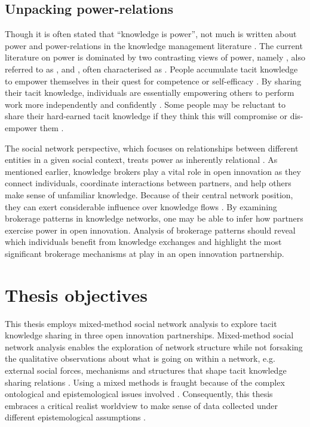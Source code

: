 \subsection{Unpacking power-relations} 

Though it is often stated that \enquote{knowledge is power}, not much is written about power and power-relations in the knowledge management literature \citep{haugaard2012rethinking}. The current literature on power is dominated by two contrasting views of power, namely , also referred to as , and , often characterised as  \citep{haugaard2012rethinking}.  People accumulate tacit knowledge to empower themselves in their quest for competence or self-efficacy \citep{endres2007tacit}. By sharing their tacit knowledge, individuals are essentially empowering others to perform work more independently and confidently \citep{bordum2002tacit,lin2007share}. Some people may be reluctant to share their hard-earned tacit knowledge if they think this will compromise or dis-empower them \citep{schultze2004knowing,singh2019territoriality}. \medskip

The social network perspective, which focuses on relationships between different entities in a given social context,  treats power as inherently relational \citep{ibarra1993power}. As mentioned earlier, knowledge brokers play a vital role in open innovation as they connect individuals, coordinate interactions between partners, and help others make sense of unfamiliar knowledge. Because of their central network position, they can exert considerable influence over knowledge flows \citep{burt1992structural}. By examining brokerage patterns in knowledge networks, one may be able to infer how partners exercise power in open innovation. Analysis of brokerage patterns should reveal which individuals benefit from knowledge exchanges and highlight the most significant brokerage mechanisms at play in an open innovation partnership. 

\section{Thesis objectives}

This thesis employs mixed-method social network analysis to explore tacit knowledge sharing in three open innovation partnerships. Mixed-method social network analysis enables the exploration of network structure while not forsaking the qualitative observations about what is going on within a network, e.g. external social forces, mechanisms and structures that shape tacit knowledge sharing relations \citep{crossley2010social}. Using a mixed methods is fraught because of the complex ontological and epistemological issues involved \citep{giddings2006mixed,mcevoy2006critical}. Consequently, this thesis embraces a critical realist worldview to make sense of data collected under different epistemological assumptions \citep{johnson2004mixed,giddings2006mixed,welch2011theorising}. \medskip

